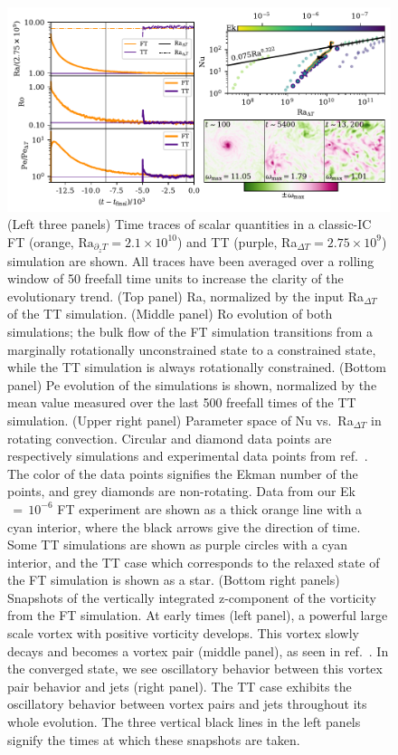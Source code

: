 \documentclass[aps, pre, onecolumn, nofootinbib, notitlepage, groupedaddress, amsfonts, amssymb, amsmath, longbibliography, superscriptaddress]{revtex4-1}
\begin{document}
\begin{figure}[t!]
\includegraphics[width=\textwidth]{./figs/rotating_panels.pdf}
\caption{ 
	(Left three panels) Time traces of scalar quantities in a classic-IC FT (orange, $\text{Ra}_{\partial_z T} = 2.1 \times 10^{10}$) and TT (purple, Ra$_{\Delta T} = 2.75\times 10^9$) simulation are shown.
	All traces have been averaged over a rolling window of 50 freefall time units to increase the clarity of the evolutionary trend.
	(Top panel) Ra, normalized by the input Ra$_{\Delta T}$ of the TT simulation.
	(Middle panel) Ro evolution of both simulations; the bulk flow of the FT simulation transitions from a marginally rotationally unconstrained state to a constrained state, while the TT simulation is always rotationally constrained.
	(Bottom panel) Pe evolution of the simulations is shown, normalized by the mean value measured over the last 500 freefall times of the TT simulation.
	(Upper right panel) Parameter space of Nu vs.~Ra$_{\Delta T}$ in rotating convection.
	Circular and diamond data points are respectively simulations and experimental data points from ref.~\cite{cheng&all2015}.
	The color of the data points signifies the Ekman number of the points, and grey diamonds are non-rotating.
	Data from our Ek$\,=\,10^{-6}$ FT experiment are shown as a thick orange line with a cyan interior, where the black arrows give the direction of time.
	Some TT simulations are shown as purple circles with a cyan interior, and the TT case which corresponds to the relaxed state of the FT simulation is shown as a star.
	(Bottom right panels) Snapshots of the vertically integrated z-component of the vorticity from the FT simulation.
	At early times (left panel), a powerful large scale vortex with positive vorticity develops.
	This vortex slowly decays and becomes a vortex pair (middle panel), as seen in ref.~\cite{stellmach&all2014}.
	In the converged state, we see oscillatory behavior between this vortex pair behavior and jets (right panel).
	The TT case exhibits the oscillatory behavior between vortex pairs and jets throughout its whole evolution.
	The three vertical black lines in the left panels signify the times at which these snapshots are taken.
\label{fig:rotating_panels} }
\end{figure}
\end{document}

